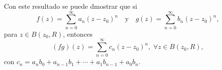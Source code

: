 \begin{observation}
Con este resultado se puede dmostrar que si 
\[f\left(z\right)=\sum^{\infty}_{n = 0}a_{n}\left(z-z_{0}\right)^{n} \quad \text{y} \quad g\left(z\right)=\sum^{\infty}_{n=0}b_{n}\left(z-z_{0}\right)^{n} ,\]
para $\displaystyle z \in B\left(z_{0}, R\right) $, entonces
\[\left(fg\right)\left(z\right)=\sum^{\infty}_{n = 0}c_{n}\left(z-z_{0}\right)^{n}, \; \forall z \in B\left(z_{0}, R\right) ,\]
con $\displaystyle c_{n}=a_{n}b_{0} + a_{n-1}b_{1} + \cdots + a_{1}b_{n-1}+a_{0}b_{n} $.
\end{observation}

